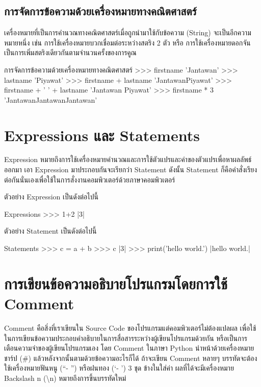 \subsection{การจัดการข้อความด้วยเครื่องหมายทางคณิตศาสตร์}

เครื่องหมายที่เป็นการคำนวณทางคณิตศาสตร์เมื่อถูกนำมาใช้กับข้อความ (String) จะเป็นอีกความหมายหนึ่ง เช่น การใช้เครื่องหมายบวกเชื่อมต่อระหว่างสตริง 2 ตัว หรือ การใช้เครื่องหมายดอกจันเป็นการเพิ่มสตริงเดียวกันตามจำนวนครั้งของการคูณ

\begin{codelist}{การจัดการข้อความด้วยเครื่องหมายทางคณิตศาสตร์}{}
>>> firstname
'Jantawan'
>>> lastname
'Piyawat'
>>> firstname + lastname
'JantawanPiyawat'
>>> firstname + '  ' + lastname
'Jantawan Piyawat'
>>> firstname * 3
'JantawanJantawanJantawan'
\end{codelist}


\section{Expressions และ Statements}

Expression หมายถึงการใช้เครื่องหมายคำนวณและการใช้ตัวแปรและค่าของตัวแปรเพื่อหาผลลัพธ์ออกมา เอา Expression มาประกอบกันจะเรียกว่า Statement ดังนั้น Statement ก็คือคำสั่งเรียงต่อกันนั่นเองเพื่อใช้ในการสั่งงานคอมพิวเตอร์ด้วยภาษาคอมพิวเตอร์ 

ตัวอย่าง Expression เป็นดังต่อไปนี้

\begin{codelist}{Expressions}{}
>>> 1+2
|3|
\end{codelist}

ตัวอย่าง Statement เป็นดังต่อไปนี้

\begin{codelist}{Statements}{}
>>> c = a + b
>>> c
|3|
>>> print('hello world.')
|hello world.|

\end{codelist}


\section{การเขียนข้อความอธิบายโปรแกรมโดยการใช้ Comment}

Comment คือสิ่งที่เราเขียนใน Source Code ของโปรแกรมแต่คอมพิวเตอร์ไม่ต้องแปลผล เพื่อใช้ในการเขียนข้อความประกอบคำอธิบายในการสื่อสารระหว่างผู้เขียนโปรแกรมด้วยกัน หรือเป็นการเตือนความจำของผู้เขียนโปรแกรมเอง โดย Comment ในภาษา Python นำหน้าด้วยเครื่องหมายชาร์ป (\#) แล้วหลังจากนั้นตามด้วยข้อความอะไรก็ได้ ถ้าจะเขียน Comment หลายๆ บรรทัดจะต้องใช้เครื่องหมายฟันหนู  (\textquotedblleft - \textquotedblright) หรือฝนทอง  (\textquoteleft - \textquoteright) 3 ชุด ข้างในใส่ค่า ผลที่ได้จะมีเครื่องหมาย Backslash n (\textbackslash n) หมายถึงการขึ้นบรรทัดใหม่ 

